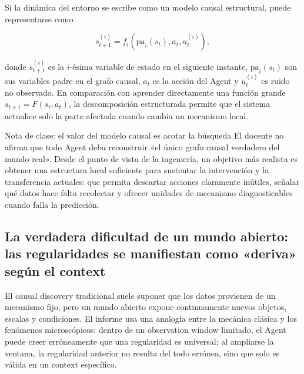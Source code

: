 
Si la dinámica del entorno se escribe como un modelo causal estructural, puede representarse como

$$
s_{t+1}^{(i)}=f_i\!\left(\mathrm{pa}_i(s_t),a_t,u_t^{(i)}\right),
$$

donde $s_{t+1}^{(i)}$ es la $i$-ésima variable de estado en el siguiente instante, $\mathrm{pa}_i(s_t)$ son sus variables padre en el grafo causal, $a_t$ es la acción del Agent y $u_t^{(i)}$ es ruido no observado. En comparación con aprender directamente una función grande $s_{t+1}=F(s_t,a_t)$, la descomposición estructurada permite que el sistema actualice solo la parte afectada cuando cambia un mecanismo local.

\begin{knowledgebox}{Nota de clase: el valor del modelo causal es acotar la búsqueda}
El docente no afirma que todo Agent deba reconstruir «el único grafo causal verdadero del mundo real». Desde el punto de vista de la ingeniería, un objetivo más realista es obtener una estructura local suficiente para sustentar la intervención y la transferencia actuales: que permita descartar acciones claramente inútiles, señalar qué datos hace falta recolectar y ofrecer unidades de mecanismo diagnosticables cuando falla la predicción.
\end{knowledgebox}


\subsection{La verdadera dificultad de un mundo abierto: las regularidades se manifiestan como «deriva» según el context}

El causal discovery tradicional suele suponer que los datos provienen de un mecanismo fijo, pero un mundo abierto expone continuamente nuevos objetos, escalas y condiciones. El informe usa una analogía entre la mecánica clásica y los fenómenos microscópicos: dentro de un observation window limitado, el Agent puede creer erróneamente que una regularidad es universal; al ampliarse la ventana, la regularidad anterior no resulta del todo errónea, sino que solo es válida en un context específico.

